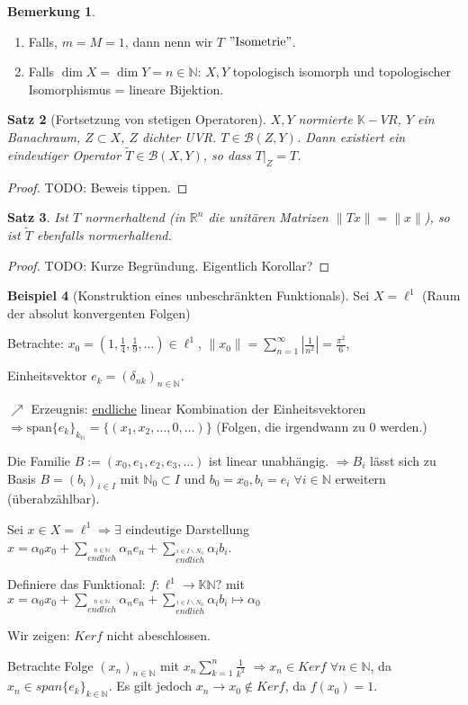 \documentclass[ngerman]{report}
\theoremstyle{plain}%
\newtheorem{thm}{Satz}[chapter]
\theoremstyle{definition}%
\newtheorem{bsp}[thm]{Beispiel}
\theoremstyle{myStyle}
\newtheorem{bem}[thm]{Bemerkung}
\newcommand{\R}{\mathbb{R}}
\newcommand{\N}{\mathbb{N}}
\newcommand{\K}{\mathbb{K}}
\newcommand{\B}{\mathcal{B}} %
\newcommand{\BS}[1][X,Y]{\mathcal{B}(#1)} %
\newcommand{\norm}[1]{\|#1\|}
\newcommand{\df}[1][]{%
	\overset{#1}{\Rightarrow}
}
\newcommand{\qmarks}[1]{$"\text{#1}"$}
\begin{document}
	\begin{bem}
		\begin{enumerate}
			\item Falls, $m=M=1$, dann nenn wir $T$ \qmarks{Isometrie}.
			\item Falls $\dim X = \dim Y = n\in \N$: $X,Y$ topologisch isomorph und topologischer Isomorphismus = lineare Bijektion.
		\end{enumerate}
	\end{bem}
	\begin{thm}[Fortsetzung von stetigen Operatoren]
		$X,Y$ normierte $\K-VR$, $Y$ ein Banachraum, $Z\subset X$, $Z$ dichter UVR.
		$T\in \B(Z,Y)$. Dann existiert ein eindeutiger Operator $\tilde{T} \in \BS$, so dass
		$T|_Z = T$.
	\end{thm}
	\begin{proof}
					TODO: Beweis tippen.
	\end{proof}
	\begin{thm}
					Ist $T$ normerhaltend (in $\R^n$ die unitären Matrizen $\norm{Tx} = \norm{x}$), so ist $\tilde{T}$ ebenfalls normerhaltend.
	\end{thm}
		\begin{proof}
						TODO: Kurze Begründung. Eigentlich Korollar?%
		\end{proof}

	\begin{bsp}[Konstruktion eines unbeschränkten Funktionals]
		Sei $X= \ell^1$ ({Raum der absolut konvergenten Folgen})\par
		Betrachte: $x_0 = (1, \frac{1}{4}, \frac{1}{9},\dots) \in \ell^1$, 
		$\norm{x_0} = \sum_{n=1}^\infty |\frac{1}{n^2}| = \frac{\pi^2}{6} $,\par
		Einheitsvektor $e_k = (\delta_{nk})_{n\in\N}$.\par 
		$\nearrow$ Erzeugnis: \underline{endliche} linear Kombination der Einheitsvektoren 
		$\df \text{span} \{e_k\}_{k_\N} = \{(x_1,x_2,\dots,0,\dots)\}$ (Folgen, die irgendwann zu $0$ werden.)\par
		Die Familie $B := (x_0,e_1,e_2,e_3,\dots)$ ist linear unabhängig.
		$\df B_i$ lässt sich zu Basis $B = (b_i)_{i\in I}$ mit $\N_0 \subset I$ und $b_0 = x_0, b_i = e_i \; \forall i\in \N$ erweitern (überabzählbar).\par
		Sei $x\in X= \ell^1 \df \exists$ eindeutige Darstellung 
		$x = \alpha_0 x_0 +\sum_{\overset{n\in\N}{endlich}} \alpha_n e_n + \sum_{\overset{i\in I\backslash N_0}{endlich}}\alpha_i b_i$. \par
		Definiere das Funktional: $f: \ell^1 \to \K \N?$ mit $x = \alpha_0 x_0 +\sum_{\overset{n\in\N}{endlich}} \alpha_n e_n + \sum_{\overset{i\in I\backslash N_0}{endlich}}\alpha_i b_i \mapsto \alpha_0$\par
	Wir zeigen: $Ker f$ nicht abeschlossen.\par
		Betrachte Folge $(x_n)_{n\in\N}$ mit $x_n \sum_{k=1}^n \frac{1}{k^2}$		 
		$\df x_n\in Ker f \; \forall n\in\N$, da $x_n\in span\{e_k\}_{k\in\N}$. 
		Es gilt jedoch $x_n \to x_0 \not\in Ker f$, da $f(x_0) = 1$.
	\end{bsp}
\end{document}
